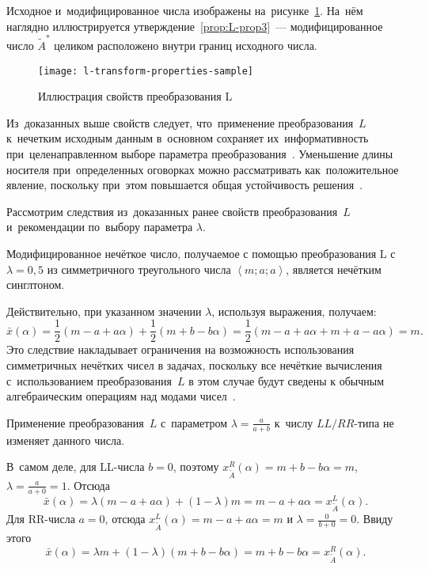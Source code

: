 Исходное и~модифицированное числа изображены на~рисунке~\ref{fig:l-transform-properties-sample}. На~нём наглядно иллюстрируется утверждение~\ref{prop:L-prop3}~--- модифицированное число $\tilde A^{*}$ целиком расположено внутри границ исходного числа.
\begin{figure}[h!]
  \centering
  {
    \texttt{[image: l-transform-properties-sample]}
    \caption{Иллюстрация свойств преобразования L}
    \label{fig:l-transform-properties-sample}
  }
\end{figure}

Из~доказанных выше свойств следует, что~применение преобразования~$L$ к~нечетким исходным данным в~основном сохраняет их~информативность при~целенаправленном выборе параметра преобразования~\cite{VSU-1}. Уменьшение длины носителя при~определенных оговорках можно рассматривать как~положительное явление, поскольку при~этом повышается общая устойчивость решения~\cite{Vorontsov_PI}.

Рассмотрим следствия из~доказанных ранее свойств преобразования~$L$ и~рекомендации по~выбору параметра $\lambda$.
\begin{cor}
Модифицированное нечёткое число, получаемое с помощью преобразования L с~$\lambda =0,5$ из симметричного треугольного числа $\left\langle m;a;a \right\rangle$, является нечётким синглтоном.
\end{cor}
Действительно, при указанном значении $\lambda $, используя выражения, получаем:
\begin{equation*}
  \bar{x}\left( \alpha  \right)=\frac{1}{2}\left( m-a+a\alpha  \right)+\frac{1}{2}\left( m+b-b\alpha  \right)=\frac{1}{2}\left( m-a+a\alpha +m+a-a\alpha  \right)=m.
\end{equation*}
Это следствие накладывает ограничения на возможность использования симметричных нечётких чисел в задачах, поскольку все нечёткие вычисления с~использованием преобразования~$L$ в этом случае будут сведены к обычным алгебраическим операциям над модами чисел~\cite{Alushta-1, VSU-1}.

\begin{cor}
Применение преобразования~$L$ с~параметром $\displaystyle \lambda =\frac{a}{a+b}$ к~числу $LL/RR$-типа не изменяет данного числа.
\end{cor}
В~самом деле, для LL-числа $b=0$, поэтому $x_{{\tilde{A}}}^{R}\left( \alpha  \right)=m+b-b\alpha=m$, $\displaystyle \lambda=\frac{a}{a+0}=1$. Отсюда
\begin{equation*}
  \bar{x}\left( \alpha  \right)=\lambda \left( m-a+a\alpha  \right)+\left( 1-\lambda  \right)m=m-a+a\alpha =x_{\tilde A}^{L}\left( \alpha  \right).
\end{equation*}
Для RR-числа $a=0$, отсюда $x_{\tilde A}^{L}\left( \alpha  \right)=m-a+a\alpha=m$ и $\displaystyle \lambda =\frac{0}{b+0}=0$. Ввиду этого
\begin{equation*}
  \bar{x}\left( \alpha  \right)=\lambda m+\left( 1-\lambda  \right)\left( m+b-b\alpha  \right)=m+b-b\alpha =x_{\tilde A}^{R}\left( \alpha  \right).
\end{equation*}

